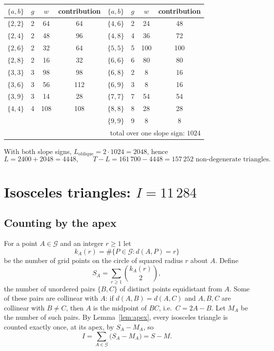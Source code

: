 \documentclass[11pt,a4paper]{article}
\theoremstyle{remark}
\newcommand{\G}{\mathcal{G}}
\begin{document}
\begin{center}
\begin{tabular}{cccc@{\qquad}cccc}
\toprule
$\{a,b\}$ & $g$ & $w$ & contribution & $\{a,b\}$ & $g$ & $w$ & contribution\\
\midrule
$\{2,2\}$ & 2 & 64 & 64  & $\{4,6\}$ & 2 & 24 & 48 \\
$\{2,4\}$ & 2 & 48 & 96  & $\{4,8\}$ & 4 & 36 & 72 \\
$\{2,6\}$ & 2 & 32 & 64  & $\{5,5\}$ & 5 & 100 & 100 \\
$\{2,8\}$ & 2 & 16 & 32  & $\{6,6\}$ & 6 & 80 & 80 \\
$\{3,3\}$ & 3 & 98 & 98  & $\{6,8\}$ & 2 & 8 & 16 \\
$\{3,6\}$ & 3 & 56 & 112 & $\{6,9\}$ & 3 & 8 & 16 \\
$\{3,9\}$ & 3 & 14 & 28  & $\{7,7\}$ & 7 & 54 & 54 \\
$\{4,4\}$ & 4 & 108 & 108 & $\{8,8\}$ & 8 & 28 & 28 \\
          &   &    &      & $\{9,9\}$ & 9 & 8 & 8 \\
\midrule
\multicolumn{8}{r}{total over one slope sign: $1024$}\\
\bottomrule
\end{tabular}
\end{center}

With both slope signs, $L_{\text{oblique}}=2\cdot1024=2048$, hence
\[
  L = 2400+2048 = 4448,
  \qquad
  T-L = 161\,700-4448 = 157\,252 \text{ non-degenerate triangles.}
\]

\section{Isosceles triangles: $I=11\,284$}

\subsection{Counting by the apex}

For a point $A\in\G$ and an integer $r\ge1$ let
\[
  k_A(r)=\#\{P\in\G : d(A,P)=r\}
\]
be the number of grid points on the circle of squared radius $r$ about $A$.
Define
\[
  S_A=\sum_{r\ge1}\binom{k_A(r)}{2},
\]
the number of unordered pairs $\{B,C\}$ of distinct points equidistant from $A$.
Some of these pairs are collinear with $A$: if $d(A,B)=d(A,C)$ and $A,B,C$ are
collinear with $B\ne C$, then $A$ is the midpoint of $BC$, i.e.\ $C=2A-B$. Let $M_A$
be the number of such pairs. By Lemma~\ref{lem:apex}, every isosceles triangle is
counted exactly once, at its apex, by $S_A-M_A$, so
\begin{equation}\label{eq:I}
  I=\sum_{A\in\G}\bigl(S_A-M_A\bigr)=S-M .
\end{equation}
\end{document}
